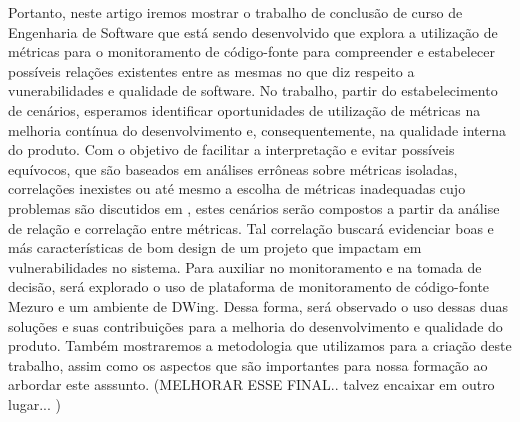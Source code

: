 Portanto, neste artigo iremos mostrar o trabalho de conclusão de curso de Engenharia de Software que está sendo desenvolvido que explora a utilização de métricas para o monitoramento de código-fonte para compreender e estabelecer possíveis relações existentes entre as mesmas no que diz respeito a vunerabilidades e qualidade de software. No trabalho,  partir do estabelecimento de cenários, esperamos identificar oportunidades de utilização de métricas na melhoria contínua do desenvolvimento e, consequentemente, na qualidade interna do produto. Com o objetivo de facilitar a interpretação e evitar possíveis equívocos, que são baseados em análises errôneas sobre métricas isoladas, correlações inexistes ou até mesmo a escolha de métricas inadequadas cujo problemas são discutidos em \cite{chidamber1994}, estes cenários serão compostos a partir da análise de relação e correlação entre métricas. Tal correlação buscará evidenciar boas e más características de bom design de um projeto que impactam em vulnerabilidades no sistema. Para auxiliar no monitoramento e na tomada de decisão, será explorado o uso de plataforma de monitoramento de código-fonte Mezuro e um ambiente de DWing. Dessa forma, será observado o uso dessas duas soluções e suas contribuições para a melhoria do desenvolvimento e qualidade do produto. Também mostraremos a metodologia que utilizamos para a criação deste trabalho, assim como os aspectos que são importantes para nossa formação ao arbordar este asssunto. (MELHORAR ESSE FINAL.. talvez encaixar em outro lugar... )

